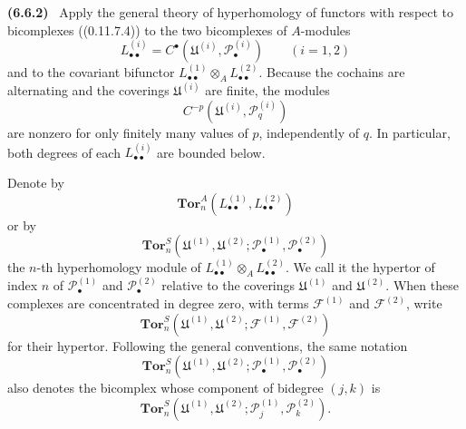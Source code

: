 \documentclass[10pt,oneside]{book}
\newcommand{\sh}[1]{\mathscr{#1}}
\newcommand{\sref}[2][]{(#2)}
\newenvironment{env}[1][]{\par\medskip\noindent\textbf{(#1)}\ }{\par}
\begin{document}
\begin{env}[6.6.2]
\label{III.6.6.2}
Apply the general theory of hyperhomology of functors with
respect to bicomplexes (\sref[0]{0.11.7.4}) to the two
bicomplexes of $A$-modules
\[
  L_{\bullet\bullet}^{(i)}
  =
  C^\bullet(\mathfrak U^{(i)},\sh P_\bullet^{(i)})
  \qquad(i=1,2)
\]
and to the covariant bifunctor
$L_{\bullet\bullet}^{(1)}\otimes_A
 L_{\bullet\bullet}^{(2)}$.
Because the cochains are alternating and the coverings
$\mathfrak U^{(i)}$ are finite, the modules
\[
  C^{-p}(\mathfrak U^{(i)},\sh P_q^{(i)})
\]
are nonzero for only finitely many values of $p$, independently
of $q$.  In particular, both degrees of each
$L_{\bullet\bullet}^{(i)}$ are bounded below.

Denote by
\[
  \mathbf{Tor}_n^A
  (L_{\bullet\bullet}^{(1)},L_{\bullet\bullet}^{(2)})
\]
or by
\[
  \mathbf{Tor}_n^S
  (\mathfrak U^{(1)},\mathfrak U^{(2)};
   \sh P_\bullet^{(1)},\sh P_\bullet^{(2)})
\]
the $n$-th hyperhomology module of
$L_{\bullet\bullet}^{(1)}\otimes_A
 L_{\bullet\bullet}^{(2)}$.  We call it the hypertor of index
$n$ of $\sh P_\bullet^{(1)}$ and $\sh P_\bullet^{(2)}$ relative
to the coverings $\mathfrak U^{(1)}$ and
$\mathfrak U^{(2)}$.  When these complexes are concentrated in
degree zero, with terms $\sh F^{(1)}$ and $\sh F^{(2)}$, write
\[
  \mathbf{Tor}_n^S
  (\mathfrak U^{(1)},\mathfrak U^{(2)};
   \sh F^{(1)},\sh F^{(2)})
\]
for their hypertor.  Following the general conventions, the
same notation
\[
  \mathbf{Tor}_n^S
  (\mathfrak U^{(1)},\mathfrak U^{(2)};
   \sh P_\bullet^{(1)},\sh P_\bullet^{(2)})
\]
also denotes the bicomplex whose component of bidegree $(j,k)$
is
\[
  \mathbf{Tor}_n^S
  (\mathfrak U^{(1)},\mathfrak U^{(2)};
   \sh P_j^{(1)},\sh P_k^{(2)}).
\]


\end{env}
\end{document}
